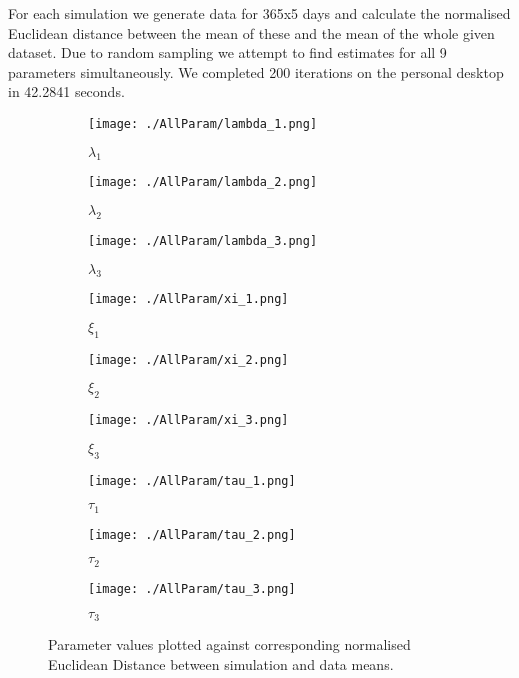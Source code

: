 For each simulation we generate data for 365x5 days and calculate the normalised Euclidean distance between the mean of these and the mean of the whole given dataset. Due to random sampling we attempt to find estimates for all 9 parameters simultaneously. We completed 200 iterations on the personal desktop in 42.2841 seconds.


\begin{figure}
    \centering
    \begin{subfigure}{.3\textwidth}
        \centering
        \texttt{[image: ./AllParam/lambda\_1.png]}
        \caption{$\lambda_1$ }
        \label{allp:lambda1}
    \end{subfigure}
    \begin{subfigure}{.3\textwidth}
        \centering
        \texttt{[image: ./AllParam/lambda\_2.png]}
        \caption{$\lambda_2$ }
        \label{allp:lambda2}
    \end{subfigure}    
    \begin{subfigure}{.3\textwidth}
        \centering
        \texttt{[image: ./AllParam/lambda\_3.png]}
        \caption{$\lambda_3$ }
        \label{allp:lambda3}
    \end{subfigure}
    \begin{subfigure}{.3\textwidth} 
        \centering
        \texttt{[image: ./AllParam/xi\_1.png]}
        \caption{$\xi_1$ }
        \label{allp:xi1}
    \end{subfigure}
    \begin{subfigure}{.3\textwidth}
        \centering
        \texttt{[image: ./AllParam/xi\_2.png]}
        \caption{$\xi_2$ }
        \label{allp:xi2}
    \end{subfigure}
    \begin{subfigure}{.3\textwidth}
        \centering
        \texttt{[image: ./AllParam/xi\_3.png]}
        \caption{$\xi_3$ }
        \label{allp:xi3}
    \end{subfigure}
    \begin{subfigure}{.3\textwidth}
        \centering
        \texttt{[image: ./AllParam/tau\_1.png]}
        \caption{$\tau_1$ }
        \label{allp:tau1}
    \end{subfigure}
    \begin{subfigure}{.3\textwidth}  
        \centering
        \texttt{[image: ./AllParam/tau\_2.png]}
        \caption{$\tau_2$ }
        \label{allp:tau2}
    \end{subfigure}
    \begin{subfigure}{.3\textwidth}
        \centering
        \texttt{[image: ./AllParam/tau\_3.png]}
        \caption{$\tau_3$ }
        \label{allp:tau3}
    \end{subfigure}

      \caption{Parameter values plotted against corresponding normalised Euclidean Distance between simulation and data means.}
      \label{allp}
\end{figure}
    
